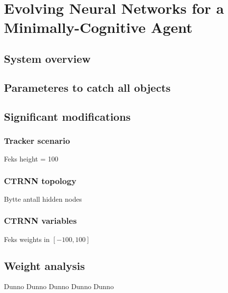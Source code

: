 \section{Evolving Neural Networks for a Minimally-Cognitive Agent}
\subsection{System overview}



\subsection{Parameteres to catch all objects}


\subsection{Significant modifications}
\subsubsection{Tracker scenario}
Feks height = 100

\subsubsection{CTRNN topology}
Bytte antall hidden nodes

\subsubsection{CTRNN variables}
Feks weights in $[-100, 100]$

\subsection{Weight analysis}
Dunno Dunno Dunno Dunno Dunno 
